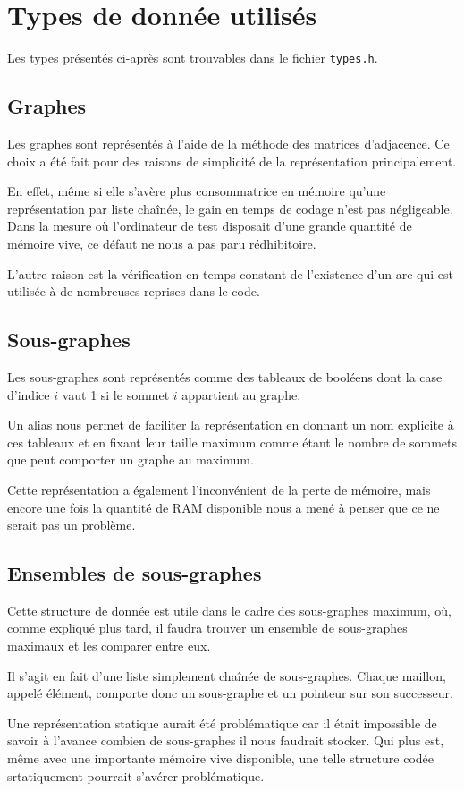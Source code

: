 \section{Types de donnée utilisés}

Les types présentés ci-après sont trouvables dans le fichier \verb|types.h|.

\subsection{Graphes}

Les graphes sont représentés à l'aide de la méthode des matrices d'adjacence. Ce choix a été fait pour des raisons de simplicité de la représentation principalement. 

En effet, même si elle s’avère  plus consommatrice en mémoire qu'une représentation par liste  chaînée, le gain en temps de codage n'est pas négligeable. Dans la mesure où l'ordinateur de test disposait d'une grande quantité de mémoire vive, ce défaut ne nous a pas paru rédhibitoire. 

L'autre raison est la vérification en temps constant de l'existence d'un arc qui est utilisée à de nombreuses reprises dans le code. 

\subsection{Sous-graphes}

Les sous-graphes sont représentés comme des tableaux de booléens dont la case d'indice $i$ vaut 1 si le sommet $i$ appartient au graphe. 

Un alias nous permet de faciliter la représentation en donnant un nom explicite à ces tableaux et en fixant leur taille maximum comme étant le nombre de sommets que peut comporter un graphe au maximum. 

Cette représentation a également l'inconvénient de la perte de mémoire, mais encore une fois la quantité de RAM disponible nous a mené à penser que ce ne serait pas un problème. 

\subsection{Ensembles de sous-graphes}

Cette structure de donnée est utile dans le cadre des sous-graphes maximum, où, comme expliqué plus tard, il faudra trouver un ensemble de sous-graphes maximaux et les comparer entre eux. 

Il s'agit en fait d'une liste simplement chaînée de sous-graphes. Chaque maillon, appelé élément, comporte donc un sous-graphe et un pointeur sur son successeur. 

Une représentation statique aurait été problématique car il était impossible de savoir à l'avance combien de sous-graphes il nous faudrait stocker. Qui plus est, même avec une importante mémoire vive disponible, une telle structure codée srtatiquement pourrait s'avérer problématique.